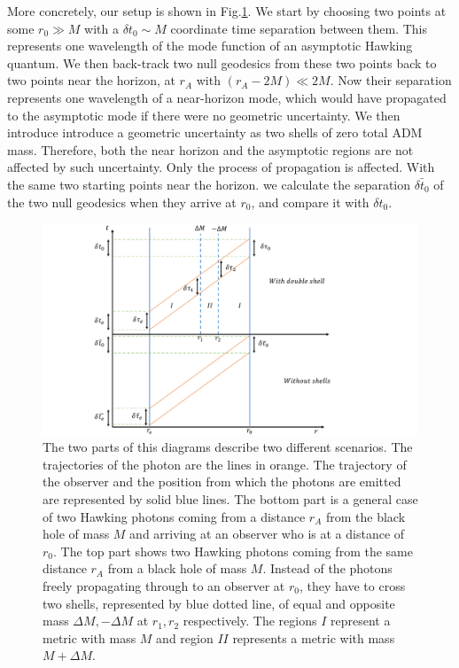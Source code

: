 \documentclass[aps,showpacs,onecolumn,floats,prd,superscriptaddress,nofootinbib]{revtex4-1}
\begin{document}
More concretely, our setup is shown in Fig.\ref{fig-setup}. 
We start by choosing two points at some $r_0\gg M$ with a $\delta t_0\sim M$ coordinate time separation between them.
This represents one wavelength of the mode function of an asymptotic Hawking quantum.
We then back-track two null geodesics from these two points back to two points near the horizon, at $r_A$ with $(r_A-2M)\ll 2M$.
Now their separation represents one wavelength of a near-horizon mode, which would have propagated to the asymptotic mode if there were no geometric uncertainty. 
We then introduce introduce a geometric uncertainty as two shells of zero total ADM mass. 
Therefore, both the near horizon and the asymptotic regions are not affected by such uncertainty.
Only the process of propagation is affected.
With the same two starting points near the horizon. we calculate the separation $\bar{\delta t_0}$ of the two null geodesics when they arrive at $r_0$, and compare it with $\delta t_0$.

\begin{figure}[tb]
\begin{center}
\includegraphics[scale = 0.6]{Propertime.pdf}
\caption{The two parts of this diagrams describe two different scenarios. The trajectories of the photon are the lines in orange. The trajectory of the observer and the position from which the photons are emitted are represented by solid blue lines. The bottom part is a general case of two Hawking photons coming from a distance $r_A$ from the black hole of mass $M$ and arriving at an observer who is at a distance of $r_0$. The top part shows two Hawking photons coming from the same distance $r_A$ from a black hole of mass $M$. Instead of the photons freely propagating through to an observer at $r_0$, they have to cross two shells, represented by blue dotted line, of equal and opposite mass $\Delta M, -\Delta M$ at $r_{1}, r_{2}$ respectively. The regions $I$ represent a metric with mass $M$ and region $II$ represents a metric with mass $M+\Delta M$.}
\label{fig-setup}
\end{center}
\end{figure}
\end{document}
